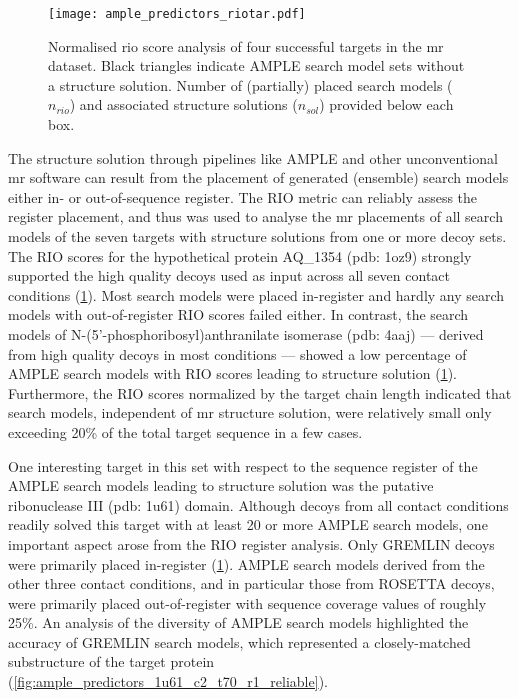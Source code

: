 \begin{figure}[H]
    \centering
    \texttt{[image: ample\_predictors\_riotar.pdf]}
    \caption[RIO score analysis of successful targets]{Normalised \gls{rio} score analysis of four successful targets in the \gls{mr} dataset. Black triangles indicate AMPLE search model sets without a structure solution. Number of (partially) placed search models ($n_{rio}$) and associated structure solutions ($n_{sol}$) provided below each box.}
    \label{fig:ample_predictor_riotar}
\end{figure}

The structure solution through pipelines like AMPLE and other unconventional \gls{mr} software \cite{Rodriguez2012-ad,Sammito2013-ug} can result from the placement of generated (ensemble) search models either in- or out-of-sequence register. The RIO metric \cite{Thomas2015-wu} can reliably assess the register placement, and thus was used to analyse the \gls{mr} placements of all search models of the seven targets with structure solutions from one or more decoy sets. The RIO scores for the hypothetical protein AQ\_1354 (\gls{pdb}: 1oz9) strongly supported the high quality decoys used as input across all seven contact conditions (\cref{fig:ample_predictor_riotar}). Most search models were placed in-register and hardly any search models with out-of-register RIO scores failed either. In contrast, the search models of N-(5’-phosphoribosyl)anthranilate isomerase (\gls{pdb}: 4aaj) --- derived from high quality decoys in most conditions --- showed a low percentage of AMPLE search models with RIO scores leading to structure solution (\cref{fig:ample_predictor_riotar}). Furthermore, the RIO scores normalized by the target chain length indicated that search models, independent of \gls{mr} structure solution, were relatively small only exceeding 20\% of the total target sequence in a few cases. 

One interesting target in this set with respect to the sequence register of the AMPLE search models leading to structure solution was the putative ribonuclease III (\gls{pdb}: 1u61) domain. Although decoys from all contact conditions readily solved this target with at least 20 or more AMPLE search models, one important aspect arose from the RIO register analysis. Only GREMLIN decoys were primarily placed in-register (\cref{fig:ample_predictor_riotar}). AMPLE search models derived from the other three contact conditions, and in particular those from ROSETTA decoys, were primarily placed out-of-register with sequence coverage values of roughly 25\%. An analysis of the diversity of AMPLE search models highlighted the accuracy of GREMLIN search models, which represented a closely-matched substructure of the target protein (\cref{fig:ample_predictors_1u61_c2_t70_r1_reliable}).  

